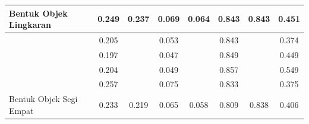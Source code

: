\begin{table}[]
\begin{tabular}{|l|cc|cc|cc|c|}
  \multirow{-5}{*}{Bentuk Objek Lingkaran}            & \multicolumn{1}{c|}{\cellcolor[HTML]{FFFFFF}0.249} & \multirow{-5}{*}{\cellcolor[HTML]{FFFFFF}0.237}  & \multicolumn{1}{c|}{\cellcolor[HTML]{FFFFFF}0.069} & \multirow{-5}{*}{\cellcolor[HTML]{FFFFFF}0.064}    & \multicolumn{1}{c|}{\cellcolor[HTML]{FFFFFF}0.843} & \multirow{-5}{*}{\cellcolor[HTML]{FFFFFF}0.843} & \multicolumn{1}{c|}{\cellcolor[HTML]{FFFFFF}0.451}   \\ \hline
                                                      & \multicolumn{1}{c|}{\cellcolor[HTML]{FFFFFF}0.205} & \cellcolor[HTML]{FFFFFF}                         & \multicolumn{1}{c|}{\cellcolor[HTML]{FFFFFF}0.053} & \cellcolor[HTML]{FFFFFF}                           & \multicolumn{1}{c|}{\cellcolor[HTML]{FFFFFF}0.843} & \cellcolor[HTML]{FFFFFF}                        & \multicolumn{1}{c|}{\cellcolor[HTML]{FFFFFF}0.374}   \\ \cline{2-2} \cline{4-4} \cline{6-6}
                                                      & \multicolumn{1}{c|}{\cellcolor[HTML]{FFFFFF}0.197} & \cellcolor[HTML]{FFFFFF}                         & \multicolumn{1}{c|}{\cellcolor[HTML]{FFFFFF}0.047} & \cellcolor[HTML]{FFFFFF}                           & \multicolumn{1}{c|}{\cellcolor[HTML]{FFFFFF}0.849} & \cellcolor[HTML]{FFFFFF}                        & \multicolumn{1}{c|}{\cellcolor[HTML]{FFFFFF}0.449}   \\ \cline{2-2} \cline{4-4} \cline{6-6}
                                                      & \multicolumn{1}{c|}{\cellcolor[HTML]{FFFFFF}0.204} & \cellcolor[HTML]{FFFFFF}                         & \multicolumn{1}{c|}{\cellcolor[HTML]{FFFFFF}0.049} & \cellcolor[HTML]{FFFFFF}                           & \multicolumn{1}{c|}{\cellcolor[HTML]{FFFFFF}0.857} & \cellcolor[HTML]{FFFFFF}                        & \multicolumn{1}{c|}{\cellcolor[HTML]{FFFFFF}0.549}   \\ \cline{2-2} \cline{4-4} \cline{6-6}
                                                      & \multicolumn{1}{c|}{\cellcolor[HTML]{FFFFFF}0.257} & \cellcolor[HTML]{FFFFFF}                         & \multicolumn{1}{c|}{\cellcolor[HTML]{FFFFFF}0.075} & \cellcolor[HTML]{FFFFFF}                           & \multicolumn{1}{c|}{\cellcolor[HTML]{FFFFFF}0.833} & \cellcolor[HTML]{FFFFFF}                        & \multicolumn{1}{c|}{\cellcolor[HTML]{FFFFFF}0.375}   \\ \cline{2-2} \cline{4-4} \cline{6-6}
  \multirow{-5}{*}{Bentuk Objek Segi Empat}           & \multicolumn{1}{c|}{\cellcolor[HTML]{FFFFFF}0.233} & \multirow{-5}{*}{\cellcolor[HTML]{FFFFFF}0.219}  & \multicolumn{1}{c|}{\cellcolor[HTML]{FFFFFF}0.065} & \multirow{-5}{*}{\cellcolor[HTML]{FFFFFF}0.058}    & \multicolumn{1}{c|}{\cellcolor[HTML]{FFFFFF}0.809} & \multirow{-5}{*}{\cellcolor[HTML]{FFFFFF}0.838} & \multicolumn{1}{c|}{\cellcolor[HTML]{FFFFFF}0.406}   \\ \hline

\end{tabular}
\end{table}

